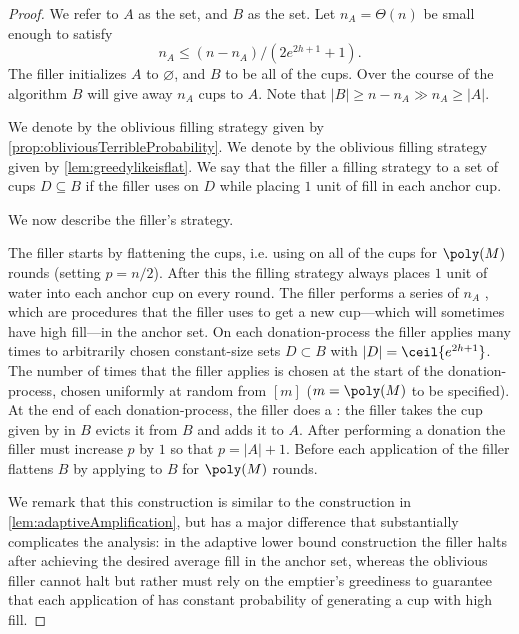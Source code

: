 \begin{proof}
  We refer to $A$ as the  set, and $B$ as the
   set. Let $n_A = \Theta(n)$ be small enough to
  satisfy
  \begin{equation}
    \label{eq:chooseBmuchbiggerthanA}
    n_A \le (n - n_A) / (2e^{2h+1} + 1).
  \end{equation}
  The filler initializes $A$ to $\varnothing$, and $B$ to be all
  of the cups. Over the course of the algorithm $B$ will give
  away $n_A$ cups to $A$. Note that $|B| \ge n-n_A \gg n_A \ge |A|$.

We denote by \randalg the oblivious filling
strategy given by \cref{prop:obliviousTerribleProbability}. 
We denote by \flatalg the oblivious filling
strategy given by \cref{lem:greedylikeisflat}.
We say that the filler  a filling strategy
\genericalg to a set of cups $D \subseteq B$ if the filler uses
\genericalg on $D$ while placing $1$ unit of fill in each anchor cup. 

We now describe the filler's strategy.

The filler starts by flattening the cups, i.e. using \flatalg on
all of the cups for $\poly(M)$ rounds (setting $p=n/2$). After
this the filling strategy always places $1$ unit of water into
each anchor cup on every round. The filler performs a series of
$n_A$ , which are
procedures that the filler uses to get a new cup---which will
sometimes have high fill---in the anchor set. On each
donation-process the filler applies \randalg many times to
arbitrarily chosen constant-size sets $D \subset B$ with $|D| =
\ceil{e^{2h+1}}$. The number of times that the filler applies
\randalg is chosen at the start of the donation-process, chosen
uniformly at random from $[m]$ ($m = \poly(M)$ to be specified).
At the end of each donation-process, the filler does a
: the filler takes the cup given by \randalg in
$B$ evicts it from $B$ and adds it to $A$. After performing a
donation the filler must increase $p$ by $1$ so that $p=|A| + 1$.
Before each application of \randalg the filler flattens $B$ by
applying \flatalg to $B$ for $\poly(M)$ rounds. 

We remark that this construction is similar to the construction
in \cref{lem:adaptiveAmplification}, but has a major difference
that substantially complicates the analysis: in the adaptive
lower bound construction the filler halts after achieving the
desired average fill in the anchor set, whereas the oblivious
filler cannot halt but rather must rely on the emptier's
greediness to guarantee that each application of \randalg has
constant probability of generating a cup with high fill.


\end{proof}
